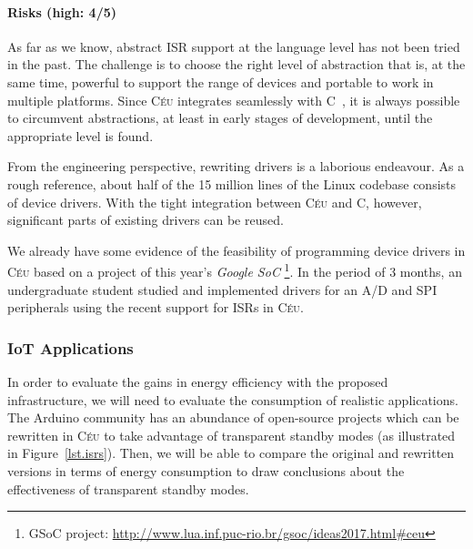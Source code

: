 \documentclass[12pt,english]{amsart}
\newcommand{\CEU}{\textsc{C\'{e}u}\xspace}
\begin{document}
\paragraph{\textbf{Risks (high: 4/5)}}

As far as we know, abstract ISR support at the language level has not been
tried in the past.
The challenge is to choose the right level of abstraction that is, at the same
time, powerful to support the range of devices and portable to work in multiple
platforms.
Since \CEU integrates seamlessly with C~\cite{ceu.tecs17}, it is always
possible to circumvent abstractions, at least in early stages of development,
until the appropriate level is found.

From the engineering perspective, rewriting drivers is a laborious endeavour.
As a rough reference, about half of the 15 million lines of the Linux codebase
consists of device drivers.
With the tight integration between \CEU and C, however, significant parts of
existing drivers can be reused.

We already have some evidence of the feasibility of programming device drivers
in \CEU based on a project of this year's \emph{Google SoC}%
\footnote{GSoC project: \url{http://www.lua.inf.puc-rio.br/gsoc/ideas2017.html#ceu}}.
In the period of 3 months, an undergraduate student studied and implemented
drivers for an A/D and SPI peripherals using the recent support for
ISRs in \CEU.

\subsubsection{IoT Applications}
\label{sec.method.apps}

In order to evaluate the gains in energy efficiency with the proposed
infrastructure, we will need to evaluate the consumption of realistic applications.
%
The Arduino community has an abundance of open-source projects which can be
rewritten in \CEU to take advantage of transparent standby modes (as illustrated
in Figure~\ref{lst.isrs}).
%
%
Then, we will be able to compare the original and rewritten versions in terms of energy
consumption to draw conclusions about the effectiveness of transparent standby
modes.
\end{document}
